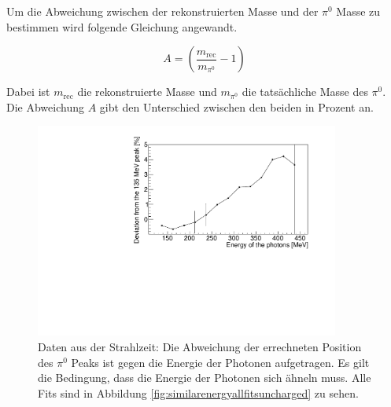 \documentclass[a4paper,11pt,oneside,final,german,openbib,pdftex]{scrbook}
\begin{document}
{ %
 
 
 Um die Abweichung zwischen der rekonstruierten Masse und der $\pi^0$ Masse zu bestimmen wird folgende Gleichung angewandt.
 
 \begin{equation}
 A = (\frac{m_{\text{rec}}}{m_{\pi^0}}-1)
 \end{equation}
 
 Dabei ist $m_{\text{rec}}$ die rekonstruierte Masse und $m_{\pi^0}$ die tats\"achliche Masse des $\pi^0$. Die Abweichung $A$ gibt den Unterschied zwischen den beiden in Prozent an.
 
 
 \begin{figure}[h!]
 	\begin{center}
 		\includegraphics[width=100mm]{20170405StrahlzeitDeviatoinNoCut}
 	
 		\caption[Strahlzeit: Abweichung; keine weiteren Bedingungen]{Daten aus der Strahlzeit: Die Abweichung der errechneten Position des $\pi^0$ Peaks ist gegen die Energie der Photonen aufgetragen.
 			Es gilt die Bedingung, dass die Energie der Photonen sich \"ahneln muss. Alle Fits sind in Abbildung \ref{fig:similarenergyallfitsuncharged} zu sehen.} 
 		\label{fig.Energydependency_pion}
 	\end{center}
 \end{figure}

}
\end{document}
